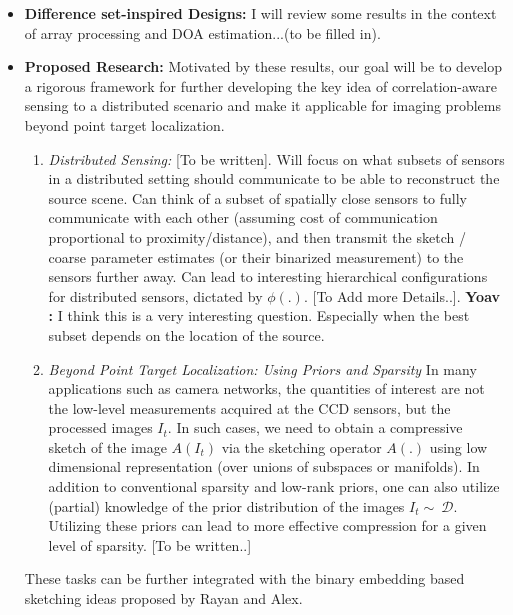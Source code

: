 \documentclass{article}
\newcommand{\comment}[3]{{\color{#1} {\bf #2 :} #3}}
\newcommand{\yoav}[1]{\comment{magenta}{Yoav}{#1}}
\begin{document}
\begin{itemize}
\item {\bf Difference set-inspired Designs:} I will review some results in the context of array processing and DOA estimation...(to be filled in).
\item {\bf Proposed Research:} Motivated by these results, our goal will be to develop a rigorous framework for further developing the key idea of correlation-aware sensing to a distributed scenario and make it applicable for imaging problems beyond point target localization.
\begin{enumerate}
\item {\em Distributed Sensing:} {\color{red} [To be written]}.  Will focus on what subsets of sensors in a distributed setting should communicate to be able to reconstruct the source scene. Can think of a subset of spatially close sensors to fully communicate with each other (assuming cost of communication proportional to proximity/distance), and then transmit the sketch / coarse parameter estimates (or their binarized measurement) to the sensors further away. Can lead to interesting hierarchical configurations for distributed sensors, dictated by $\phi(.)$. {\color{red} [To Add more Details..]}.
\yoav{I think this is a very interesting question. Especially when the best subset depends on the location of the source.}
\item {\em Beyond Point Target Localization: Using Priors and Sparsity} In many applications such as camera networks, the quantities of interest are not the low-level measurements acquired at the CCD sensors, but the processed images $I_t$. In such cases, we need to obtain a compressive sketch of the image $A (I_t)$ via the sketching operator $A (.)$ using low dimensional representation (over unions of subspaces or manifolds). In addition to conventional sparsity and low-rank priors, one can also utilize (partial) knowledge of the prior distribution of the images $I_t\sim~\mathcal{D}$. Utilizing these priors can lead to more effective compression for a given level of sparsity. {\color{red} [To be written..]}  
\end{enumerate}
{\color{red} These tasks can be further integrated with the binary embedding based sketching ideas proposed by Rayan and Alex.}
\end{itemize}
\end{document}
